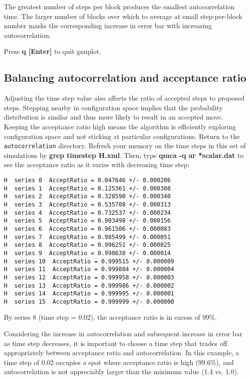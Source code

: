 The greatest number of steps per block produces the smallest autocorrelation
time.  The larger number of blocks over which to average at small
step-per-block number masks the corresponding increase in error bar with
increasing autocorrelation.

Press \textbf{q [Enter]} to quit gnuplot.

\subsection{Balancing autocorrelation and acceptance ratio}

Adjusting the time step value also affects the ratio of accepted steps to
proposed steps.  Stepping nearby in configuration space implies that the
probability distribution is similar and thus more likely to result in an
accepted move.  Keeping the acceptance ratio high means the algorithm is
efficiently exploring configuration space and not sticking at particular
configurations.  Return to the \texttt{autocorrelation} directory.  Refresh your
memory on the time steps in this set of simulations by \textbf{grep timestep
H.xml}. Then, type \textbf{qmca -q ar *scalar.dat} to see the acceptance ratio
as it varies with decreasing time step:

\begin{shaded} 
\begin{verbatim} 
H  series 0  AcceptRatio = 0.047646 +/- 0.000206 
H  series 1  AcceptRatio = 0.125361 +/- 0.000308 
H  series 2  AcceptRatio = 0.328590 +/- 0.000340 
H  series 3  AcceptRatio = 0.535708 +/- 0.000313 
H  series 4  AcceptRatio = 0.732537 +/- 0.000234 
H  series 5  AcceptRatio = 0.903498 +/- 0.000156 
H  series 6  AcceptRatio = 0.961506 +/- 0.000083 
H  series 7  AcceptRatio = 0.985499 +/- 0.000051 
H  series 8  AcceptRatio = 0.996251 +/- 0.000025 
H  series 9  AcceptRatio = 0.998638 +/- 0.000014 
H  series 10  AcceptRatio = 0.999515 +/- 0.000009 
H  series 11  AcceptRatio = 0.999884 +/- 0.000004 
H  series 12  AcceptRatio = 0.999958 +/- 0.000003 
H  series 13  AcceptRatio = 0.999986 +/- 0.000002 
H  series 14  AcceptRatio = 0.999995 +/- 0.000001 
H  series 15  AcceptRatio = 0.999999 +/- 0.000000 
\end{verbatim} 
\end{shaded}

By series 8 (time step = 0.02), the acceptance ratio is in excess of 99\%.  

Considering the increase in autocorrelation and subsequent increase in error
bar as time step decreases, it is important to choose a time step that trades
off appropriately between acceptance ratio and autocorrelation.  In this
example, a time step of 0.02 occupies a spot where acceptance ratio is high
(99.6\%), and autocorrelation is not appreciably larger than the minimum value
(1.4 vs. 1.0).

